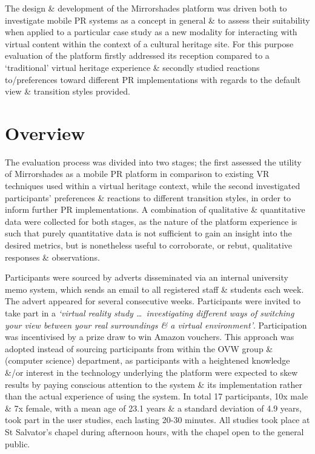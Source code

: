 The design \& development of the Mirrorshades platform was driven both to investigate mobile PR systems as a concept in general \& to assess their suitability when applied to a particular case study as a new modality for interacting with virtual content within the context of a cultural heritage site. For this purpose evaluation of the platform firstly addressed its reception compared to a `traditional' virtual heritage experience \& secondly studied reactions to/preferences toward different PR implementations with regards to the default view \& transition styles provided.




\section{Overview}

The evaluation process was divided into two stages; the first assessed the utility of Mirrorshades as a mobile PR platform in comparison to existing VR techniques used within a virtual heritage context, while the second investigated participants' preferences \& reactions to different transition styles, in order to inform further PR implementations. A combination of qualitative \& quantitative data were collected for both stages, as the nature of the platform experience is such that purely quantitative data is not sufficient to gain an insight into the desired metrics, but is nonetheless useful to corroborate, or rebut, qualitative responses \& observations.

Participants were sourced by adverts disseminated via an internal university memo system, which sends an email to all registered staff \& students each week. The advert appeared for several consecutive weeks. Participants were invited to take part in a \textit{`virtual reality study \ldots\ investigating different ways of switching your view between your real surroundings \& a virtual environment'}. Participation was incentivised by a prize draw to win Amazon vouchers. This approach was adopted instead of sourcing participants from within the OVW group \& (computer science) department, as participants with a heightened knowledge \&/or interest in the technology underlying the platform were expected to skew results by paying conscious attention to the system \& its implementation rather than the actual experience of using the system. In total 17 participants, 10x male \& 7x female, with a mean age of 23.1 years \& a standard deviation of 4.9 years, took part in the user studies, each lasting 20-30 minutes. All studies took place at St Salvator's chapel during afternoon hours, with the chapel open to the general public.

